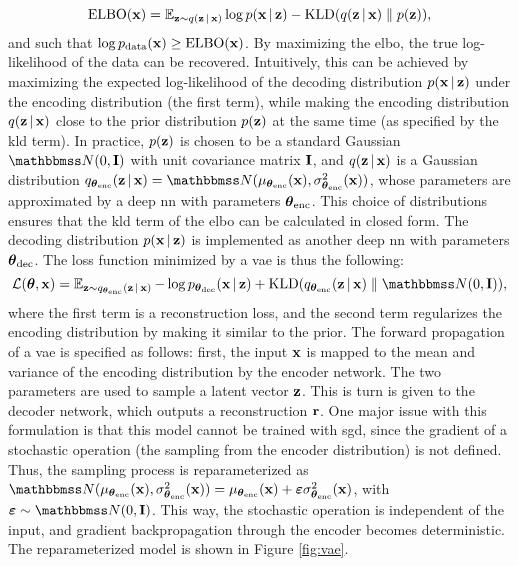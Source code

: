 $$\Fun{ELBO}(\Vector{x}) = \Expect_{\Vector{z} \sim q(\Vector{z} \given \Vector{x})} \log p(\Vector{x} \given \Vector{z}) - \Fun{KLD}(q(\Vector{z} \given \Vector{x}) \;\Vert\; p(\Vector{z})),$$
and such that $\log \PData(\Vector{x}) \geq \Fun{ELBO}(\Vector{x})$. By maximizing the \gls{elbo}, the true log-likelihood of the data can be recovered. Intuitively, this can be achieved by maximizing the expected log-likelihood of the decoding distribution $p(\Vector{x} \given \Vector{z})$ under the encoding distribution (the first term), while making the encoding distribution $q(\Vector{z} \given \Vector{x})$ close to the prior distribution $p(\Vector{z})$ at the same time (as specified by the \gls{kld} term). In practice, $p(\Vector{z})$ is chosen to be a standard Gaussian $\Normal{0}{\Matrix{i}}$ with unit covariance matrix $\Matrix{i}$, and $q(\Vector{z} \given \Vector{x})$ is a Gaussian distribution
$q_{\Param_{\mathrm{enc}}}(\Vector{z} \given \Vector{x}) = \Normal{\mu_{\Param_{\mathrm{enc}}}(\Vector{x})}{\sigma^2_{\Param_{\mathrm{enc}}}(\Vector{x})}$, whose parameters are approximated by a deep \gls{nn} with parameters $\boldsymbol{\theta}_{\mathrm{enc}}$. This choice of distributions ensures that the \gls{kld} term of the \gls{elbo} can be calculated in closed form. The decoding distribution $p(\Vector{x} \given \Vector{z})$ is implemented as another deep \gls{nn} with parameters $\boldsymbol{\theta}_{\mathrm{dec}}$. The loss function minimized by a \gls{vae} is thus the following:
$$\Loss(\Param, \Vector{x}) = \Expect_{\Vector{z} \sim q_{\Param_{\mathrm{enc}}}(\Vector{z} \given \Vector{x})} - \log p_{\Param_{\mathrm{dec}}}(\Vector{x} \given \Vector{z}) + \Fun{KLD}(q_{\Param_{\mathrm{enc}}}(\Vector{z} \given \Vector{x}) \;\Vert\; \Normal{0}{\Matrix{i}}),$$
where the first term is a reconstruction loss, and the second term regularizes the encoding distribution by making it similar to the prior. The forward propagation of a \gls{vae} is specified as follows: first, the input $\Vector{x}$ is mapped to the mean and variance of the encoding distribution by the encoder network. The two parameters are used to sample a latent vector $\Vector{z}$. This is turn is given to the decoder network, which outputs a reconstruction $\Vector{r}$. One major issue with this formulation is that this model cannot be trained with \gls{sgd}, since the gradient of a stochastic operation (the sampling from the encoder distribution) is not defined. Thus, the sampling process is reparameterized as $\Normal{\mu_{\Param_{\mathrm{enc}}}(\Vector{x})}{\sigma^2_{\Param_{\mathrm{enc}}}(\Vector{x})} = \mu_{\Param_{\mathrm{enc}}}(\Vector{x}) + \boldsymbol{\eps}\sigma^2_{\Param_{\mathrm{enc}}}(\Vector{x})$, with $\boldsymbol{\eps} \sim \Normal{0}{\Matrix{i}}$. This way, the stochastic operation is independent of the input, and gradient backpropagation through the encoder becomes deterministic. The reparameterized model is shown in Figure \ref{fig:vae}.
